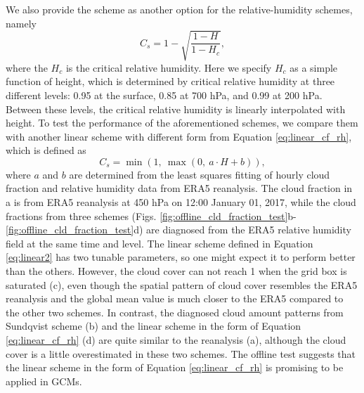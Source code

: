 We also provide the \citet{Sundqvist1989} scheme as another option for the relative-humidity schemes, namely
\begin{equation}
	C_s = 1-\sqrt{\frac{1-H}{1-H_{c}}},
	\label{eq:sundqvist}
\end{equation}
where the $H_{c}$ is the critical relative humidity. Here we specify $H_{c}$ as a simple function of height, which is determined by critical relative humidity at three different levels: 0.95 at the surface, 0.85 at 700 hPa, and 0.99 at 200 hPa. Between these levels, the critical relative humidity is linearly interpolated with height. To test the performance of the aforementioned schemes, we compare them with another linear scheme with different form from Equation \eqref{eq:linear_cf_rh}, which is defined as
\begin{equation}
	C_s = \min\left(1, ~\max \left(0, ~ a \cdot H + b \right)\right),
	\label{eq:linear2}
\end{equation}
where $a$ and $b$ are determined from the least squares fitting of hourly cloud fraction and relative humidity data from ERA5 reanalysis. The cloud fraction in a is from ERA5 reanalysis at 450 hPa on 12:00 January 01, 2017, while the cloud fractions from three schemes (Figs. \ref{fig:offline_cld_fraction_test}b-\ref{fig:offline_cld_fraction_test}d) are diagnosed from the ERA5 relative humidity field at the same time and level. The linear scheme defined in Equation \eqref{eq:linear2} has two tunable parameters, so one might expect it to perform better than the others. However, the cloud cover can not reach 1 when the grid box is saturated (c), even though the spatial pattern of cloud cover resembles the ERA5 reanalysis and the global mean value is much closer to the ERA5 compared to the other two schemes. In contrast, the diagnosed cloud amount patterns from Sundqvist scheme (b) and the linear scheme in the form of Equation \eqref{eq:linear_cf_rh} (d) are quite similar to the reanalysis (a), although the cloud cover is a little overestimated in these two schemes. The offline test suggests that the linear scheme in the form of Equation \eqref{eq:linear_cf_rh} is promising to be applied in GCMs.

